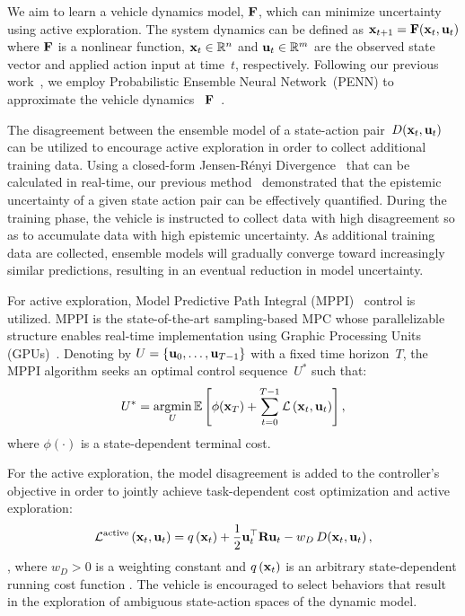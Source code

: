 We aim to learn a vehicle dynamics model, ${\bf F}$, which can minimize uncertainty using active exploration. The system dynamics can be defined as ${{\bf x}}_{t+1} = {\bf F}({\bf x}_t, {\bf u}_t)$ where ${\bf F}$ is a nonlinear function, ${\bf x}_t \in \mathbb{R}^{n}$ and ${\bf u}_t \in \mathbb{R}^{m}$ are the observed state vector and applied action input at time~$t$, respectively. Following our previous work~\cite{kim2023bridging}, we employ Probabilistic Ensemble Neural Network~(PENN) to approximate the vehicle dynamics ~${\bf F}$~\cite{chua_deep_2018, buckman_sample-efficient_2018}.

The disagreement between the ensemble model of a state-action pair~$D({\bf x}_t, {\bf u}_t)$ can be utilized to encourage active exploration in order to collect additional training data. Using a closed-form Jensen-Rényi Divergence~\cite{renyi_measures_1961, wang_closed-form_2009, shyam_model-based_2019} that can be calculated in real-time, our previous method~\cite{kim2023bridging} demonstrated that the epistemic uncertainty of a given state action pair can be effectively quantified. During the training phase, the vehicle is instructed to collect data with high disagreement so as to accumulate data with high epistemic uncertainty. As additional training data are collected, ensemble models will gradually converge toward increasingly similar predictions, resulting in an eventual reduction in model uncertainty.


For active exploration, Model Predictive Path Integral (MPPI)~\cite{williams_information_2017} control is utilized. MPPI is the state-of-the-art sampling-based MPC whose parallelizable structure enables real-time implementation using Graphic Processing Units (GPUs)~\cite{williams_information-theoretic_2018}. Denoting by $U = \{{\bf u}_0, \dots, {\bf u}_{T-1}\}$ with a fixed time horizon~$T$, the MPPI algorithm seeks an optimal control sequence~$U^{*}$ such that:
\begin{equation}
    U^{*} = \underset{U}{\operatorname{argmin}} \, \mathbb{E} \left[\phi({\bf x}_{T})+\sum_{t=0}^{T-1} \mathcal{L}\left({\bf x}_t, {\bf u}_t\right) \right] ,
\end{equation}
where $\phi\left( \cdot \right)$ is a state-dependent terminal cost. 

For the active exploration, the model disagreement is added to the controller's objective in order to jointly achieve task-dependent cost optimization and active exploration:
\begin{equation}
    \mathcal{L}^{\text{active}}\left({\bf x}_t, {\bf u}_t\right) = q \left( {\bf x}_{t} \right) + \frac{1}{2} {\bf u}_{t}^{\top} {\bf R} {\bf u}_{t} - w_{D} \, D({\bf x}_t, {\bf u}_t) \,,
    \label{eq:jrd_cost}
\end{equation}
, where $w_{D} > 0$ is a weighting constant and $q \left( {\bf x}_{t} \right)$ is an arbitrary state-dependent running cost function . The vehicle is encouraged to select behaviors that result in the exploration of ambiguous state-action spaces of the dynamic model.
